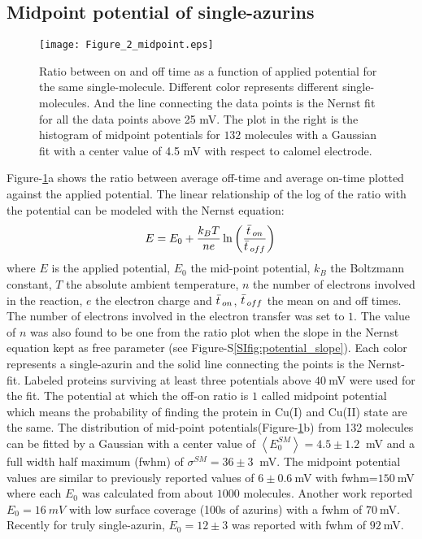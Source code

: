 \subsection{Midpoint potential of single-azurins}
\begin{figure}
	\centering
	\texttt{[image: Figure\_2\_midpoint.eps]}
	\caption{Ratio between on and off time as a function of applied potential for the same single-molecule. Different color represents different single-molecules. And the line connecting the data points is the Nernst fit for all the data points above 25 mV. The plot in the right is the histogram of midpoint potentials for $132$ molecules with a Gaussian fit with a center value of 4.5 mV with respect to calomel electrode.}
	\label{fig:midpoint}
\end{figure}
Figure-\ref{fig:midpoint}a shows the ratio between average off-time and average on-time plotted against the applied potential. The linear relationship of the log of the ratio with the potential can be modeled with the Nernst equation: 
\begin{equation}
	E = E_0 + \frac{k_BT}{n e}\ln\left(\frac{\bar{t}\,_{on}}{\bar{t}\,_{off}}\right)\,
	\label{eq:nernst}
\end{equation}
where $E$ is the applied potential, $E_0$ the mid-point potential, $k_B$ the Boltzmann constant, $T$ the absolute ambient temperature, $n$ the number of electrons involved in the reaction, $e$ the electron charge and $\bar{t}\,_{on}$, $\bar{t}\,_{off}$ the mean on and off times. The number of electrons involved in the electron transfer was set to $1$. The value of $n$ was also found to be one from the ratio plot when the slope in the Nernst equation kept as free parameter (see Figure-S\ref{SIfig:potential_slope}). Each color represents a single-azurin and the solid line connecting the points is the Nernst-fit. Labeled proteins surviving at least three potentials above $40~$mV were used for the fit. The potential at which the off-on ratio is $1$ called midpoint potential which means the probability of finding the protein in Cu(I) and Cu(II) state are the same. The distribution of mid-point potentials(Figure-\ref{fig:midpoint}b) from 132 molecules can be fitted by a Gaussian with a center value of $\left<E_0^{SM}\right>=4.5 \pm 1.2~$ mV and a full width half maximum (fwhm) of $\sigma^{SM}=36 \pm 3~$ mV. The midpoint potential values are similar to previously reported values of $6\pm0.6~$mV with fwhm=$150~$mV where each $E_0$ was calculated from about $1000$ molecules.\cite{davis2006monitoring} Another work reported $E_0 = 16~mV$ with low surface coverage (100s of azurins) with a fwhm of $70~$mV.\cite{salverda2010fluorescent} Recently for truly single-azurin, $E_0=12\pm3$ was reported with fwhm of $92~$mV.\cite{akkilic2014chemically-induced}\\
